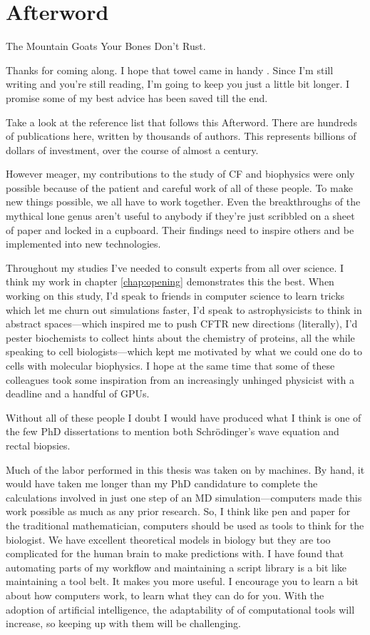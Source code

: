 \chapter{Afterword}
\label{chap:Afterword}
\begin{chapquote} {The Mountain Goats \cite{bones_dont_rust}}
Your Bones Don't Rust.
\end{chapquote}
Thanks for coming along. I hope that towel came in handy \cite{adams1979}. Since I'm still writing and you're still reading, I'm going to keep you just a little bit longer. I promise some of my best advice has been saved till the end. 

Take a look at the reference list that follows this Afterword. There are hundreds of publications here, written by thousands of authors. This represents billions of dollars of investment, over the course of almost a century. 

However meager, my contributions to the study of CF and biophysics were only possible because of the patient and careful work of all of these people. To make new things possible, we all have to work together. Even the breakthroughs of the mythical lone genus aren't useful to anybody if they're just scribbled on a sheet of paper and locked in a cupboard. Their findings need to inspire others and be implemented into new technologies.

Throughout my studies I've needed to consult experts from all over science. I think my work in chapter \ref{chap:opening} demonstrates this the best. When working on this study, I'd speak to friends in computer science to learn tricks which let me churn out simulations faster, I'd speak to astrophysicists to think in abstract spaces---which inspired me to push CFTR new directions (literally), I'd pester biochemists to collect hints about the chemistry of proteins, all the while speaking to cell biologists---which kept me motivated by what we could one do to cells with molecular biophysics. I hope at the same time that some of these colleagues took some inspiration from an increasingly unhinged physicist with a deadline and a handful of GPUs. 

Without all of these people I doubt I would have produced what I think is one of the few PhD dissertations to mention both Schr\"odinger's wave equation and rectal biopsies. 

Much of the labor performed in this thesis was taken on by machines. By hand, it would have taken me longer than my PhD candidature to complete the calculations involved in just one step of an MD simulation---computers made this work possible as much as any prior research. So, I think like pen and paper for the traditional mathematician, computers should be used as tools to think for the biologist. We have excellent theoretical models in biology but they are too complicated for the human brain to make predictions with. I have found that automating parts of my workflow and maintaining a script library is a bit like maintaining a tool belt. It makes you more useful. I encourage you to learn a bit about how computers work, to learn what they can do for you. With the adoption of artificial intelligence, the adaptability of of computational tools will increase, so keeping up with them will be challenging.

